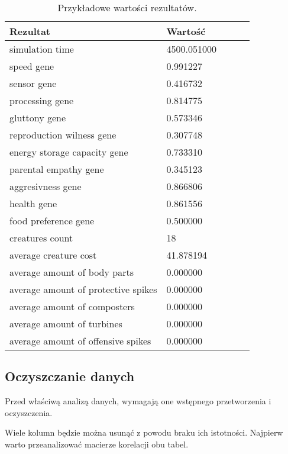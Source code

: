 \documentclass{article}
\begin{document}
\begin{table}[H]
    \begin{tabular}{lllll}
        \toprule
        \textbf{Rezultat} & \textbf{Wartość} \\
        \midrule
        simulation time                     & 4500.051000 \\
        speed gene                          & 0.991227    \\
        sensor gene                         & 0.416732    \\
        processing gene                     & 0.814775    \\
        gluttony gene                       & 0.573346    \\
        reproduction wilness gene           & 0.307748    \\
        energy storage capacity gene        & 0.733310    \\
        parental empathy gene               & 0.345123    \\
        aggresivness gene                   & 0.866806    \\
        health gene                         & 0.861556    \\
        food preference gene                & 0.500000    \\
        creatures count                     & 18   \\
        average creature cost               & 41.878194   \\
        average amount of body parts        & 0.000000    \\
        average amount of protective spikes & 0.000000    \\
        average amount of composters        & 0.000000    \\
        average amount of turbines          & 0.000000    \\
        average amount of offensive spikes  & 0.000000    \\
    \end{tabular}
    \caption{Przykładowe wartości rezultatów.}
\end{table}

\subsection{Oczyszczanie danych}
Przed właściwą analizą danych, wymagają one wstępnego przetworzenia i oczyszczenia.

Wiele kolumn będzie można usunąć z powodu braku ich istotności. Najpierw warto przeanalizować macierze korelacji obu tabel.
\end{document}
